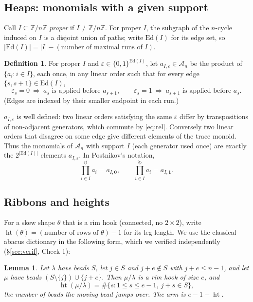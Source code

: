 \documentclass[11pt]{article}
\theoremstyle{plain}
\newtheorem{lemma}[theorem]{Lemma}
\theoremstyle{definition}
\newtheorem{definition}[theorem]{Definition}
\newcommand{\A}{\mathscr{A}}
\newcommand{\ZZ}{\mathbb{Z}}
\DeclareMathOperator{\hgt}{ht}
\begin{document}
\subsection{Heaps: monomials with a given support}

Call $I\subseteq\ZZ/n\ZZ$ \emph{proper} if $I\ne\ZZ/n\ZZ$.  For proper
$I$, the subgraph of the $n$-cycle induced on $I$ is a disjoint union of
paths; write $\mathrm{Ed}(I)$ for its edge set, so
$|\mathrm{Ed}(I)|=|I|-(\text{number of maximal runs of }I)$.

\begin{definition}\label{def:aIeps}
For proper $I$ and $\varepsilon\in\{0,1\}^{\mathrm{Ed}(I)}$, let
$a_{I,\varepsilon}\in\A_n$ be the product of $\{a_i:i\in I\}$, each once,
in any linear order such that for every edge $\{s,s+1\}\in\mathrm{Ed}(I)$,
\[
\varepsilon_{s}=0\ \Longrightarrow\ a_{s}\text{ is applied before }a_{s+1},
\qquad
\varepsilon_{s}=1\ \Longrightarrow\ a_{s+1}\text{ is applied before }a_{s}.
\]
(Edges are indexed by their smaller endpoint in each run.)
\end{definition}

$a_{I,\varepsilon}$ is well defined: two linear orders satisfying the
same $\varepsilon$ differ by transpositions of non-adjacent generators,
which commute by \eqref{eq:rel}.  Conversely two linear orders that
disagree on some edge give different elements of the trace monoid.  Thus
the monomials of $\A_n$ with support $I$ (each generator used once) are
exactly the $2^{|\mathrm{Ed}(I)|}$ elements $a_{I,\varepsilon}$.  In
Postnikov's notation,
\begin{equation}\label{eq:extremes}
\textstyle\prod^{\circlearrowleft}_{i\in I}a_i=a_{I,\mathbf 0},
\qquad
\prod^{\circlearrowright}_{i\in I}a_i=a_{I,\mathbf 1}.
\end{equation}

\subsection{Ribbons and heights}

For a skew shape $\theta$ that is a rim hook (connected, no $2\times2$),
write $\hgt(\theta)=(\text{number of rows of }\theta)-1$ for its leg
length.  We use the classical abacus dictionary in the following form,
which we verified independently (\S\ref{sec:verif}, Check 1):

\begin{lemma}\label{lem:abacus}
Let $\lambda$ have beads $S$, let $j\in S$ and $j+e\notin S$ with
$j+e\le n-1$, and let $\mu$ have beads $(S\setminus\{j\})\cup\{j+e\}$.
Then $\mu/\lambda$ is a rim hook of size $e$, and
\[
\hgt(\mu/\lambda)=\#\{s: 1\le s\le e-1,\ j+s\in S\},
\]
the number of beads the moving bead jumps over.  The arm is
$e-1-\hgt$.
\end{lemma}
\end{document}

